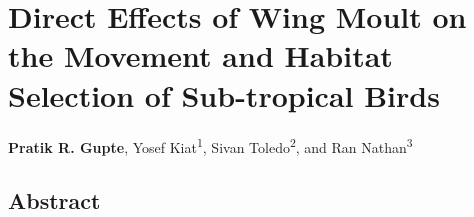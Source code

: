 \chapter{Direct Effects of Wing Moult on the Movement and Habitat Selection of Sub-tropical Birds}\label{ch:holeybirds}

\noindent \textbf{Pratik R. Gupte}, Yosef Kiat\textsuperscript{1}, Sivan Toledo\textsuperscript{2}, and Ran Nathan\textsuperscript{3}


\section*{Abstract}

\footnotesize{
    
    \medskip

}

\clearpage

